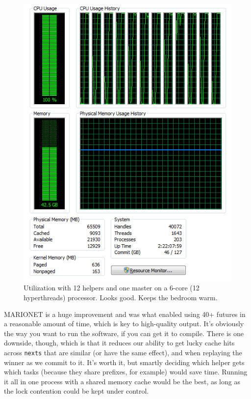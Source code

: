 \documentclass[twocolumn]{article}
\begin{document}
\begin{figure}[htb]
\begin{center}
\includegraphics[width=0.75 \linewidth]{utilization}
\end{center}\vspace{-0.1in}
\caption{Utilization with 12 helpers and one master on a 6-core (12
  hyperthreads) processor. Looks good. Keeps the bedroom warm.}
\label{fig:utilization}
\end{figure}

MARIONET is a huge improvement and was what enabled using 40+ futures
in a reasonable amount of time, which is key to high-quality output. It's
obviously the way you want to run the software, if you can get it to
compile. There is one downside, though, which is that it reduces our
ability to get lucky cache hits across {\tt nexts} that are similar (or
have the same effect), and when replaying the winner as we commit to it.
It's worth it, but smartly deciding which helper gets which tasks (because
they share prefixes, for example) would save time. Running it all in one
process with a shared memory cache would be the best, as long as the
lock contention could be kept under control.
\end{document}
